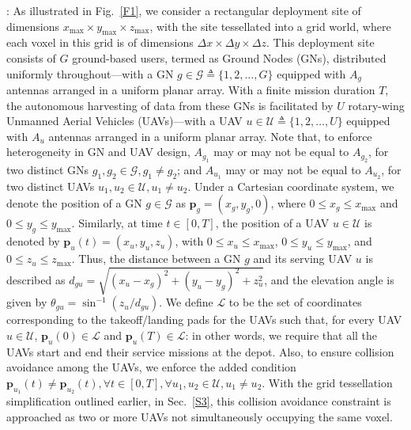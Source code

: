 \documentclass[10pt, twocolumn]{IEEEtran}
\begin{document}
: As illustrated in Fig.~\ref{F1}, we consider a rectangular deployment site of dimensions $x_{\mathrm{max}}{\times}y_{\mathrm{max}}{\times}z_{\mathrm{max}}$, with the site tessellated into a grid world, where each voxel in this grid is of dimensions $\Delta x{\times}\Delta y{\times}\Delta z$. This deployment site consists of $G$ ground-based users, termed as Ground Nodes (GNs), distributed uniformly throughout---with a GN $g{\in}\mathcal{G}{\triangleq}\{1,2,{\dots},G\}$ equipped with $A_{g}$ antennas arranged in a uniform planar array. With a finite mission duration $T$, the autonomous harvesting of data from these GNs is facilitated by $U$ rotary-wing Unmanned Aerial Vehicles (UAVs)---with a UAV $u{\in}\mathcal{U}{\triangleq}\{1,2,{\dots},U\}$ equipped with $A_{u}$ antennas arranged in a uniform planar array. Note that, to enforce heterogeneity in GN and UAV design, $A_{g_{1}}$ may or may not be equal to $A_{g_{2}}$, for two distinct GNs $g_{1},g_{2}{\in}\mathcal{G},g_{1}{\neq}g_{2}$; and $A_{u_{1}}$ may or may not be equal to $A_{u_{2}}$, for two distinct UAVs $u_{1},u_{2}{\in}\mathcal{U},u_{1}{\neq}u_{2}$. Under a Cartesian coordinate system, we denote the position of a GN $g{\in}\mathcal{G}$ as $\mathbf{p}_{g}{=}(x_{g},y_{g},0)$, where $0{\leq}x_{g}{\leq}x_{\mathrm{max}}$ and $0{\leq}y_{g}{\leq}y_{\mathrm{max}}$. Similarly, at time $t{\in}[0,T]$, the position of a UAV $u{\in}\mathcal{U}$ is denoted by $\mathbf{p}_{u}(t){=}(x_{u},y_{u},z_{u})$, with $0{\leq}x_{u}{\leq}x_{\mathrm{max}}$, $0{\leq}y_{u}{\leq}y_{\mathrm{max}}$, and $0{\leq}z_{u}{\leq}z_{\mathrm{max}}$. Thus, the distance between a GN $g$ and its serving UAV $u$ is described as $d_{gu}{=}\sqrt{(x_{u}{-}x_{g})^{2}{+}(y_{u}{-}y_{g})^{2}{+}z_{u}^{2}}$, and the elevation angle is given by $\theta_{gu}{=}\sin^{-1}{(z_{u}/d_{gu})}$. We define $\mathcal{L}$ to be the set of coordinates corresponding to the takeoff/landing pads for the UAVs such that, for every UAV $u{\in}\mathcal{U}$, $\mathbf{p}_{u}(0){\in}\mathcal{L}$ and $\mathbf{p}_{u}(T){\in}\mathcal{L}$: in other words, we require that all the UAVs start and end their service missions at the depot. Also, to ensure collision avoidance among the UAVs, we enforce the added condition $\mathbf{p}_{u_{1}}(t){\neq}\mathbf{p}_{u_{2}}(t),{\forall}t{\in}[0,T],{\forall}u_{1},u_{2}{\in}\mathcal{U},u_{1}{\neq}u_{2}$. With the grid tessellation simplification outlined earlier, in Sec.~\ref{S3}, this collision avoidance constraint is approached as two or more UAVs not simultaneously occupying the same voxel.\\
\end{document}
